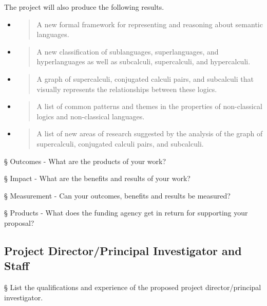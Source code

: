 The project will also produce the following results.

\begin{itemize}
\item
  \begin{quote}
  A new formal framework for representing and reasoning about semantic
  languages.
  \end{quote}
\item
  \begin{quote}
  A new classification of sublanguages, superlanguages, and
  hyperlanguages as well as subcalculi, supercalculi, and hypercalculi.
  \end{quote}
\item
  \begin{quote}
  A graph of supercalculi, conjugated calculi pairs, and subcalculi that
  visually represents the relationships between these logics.
  \end{quote}
\item
  \begin{quote}
  A list of common patterns and themes in the properties of
  non-classical logics and non-classical languages.
  \end{quote}
\item
  \begin{quote}
  A list of new areas of research suggested by the analysis of the graph
  of supercalculi, conjugated calculi pairs, and subcalculi.
  \end{quote}
\end{itemize}

§ Outcomes - What are the products of your work?

§ Impact - What are the benefits and results of your work?

§ Measurement - Can your outcomes, benefits and results be measured?

§ Products - What does the funding agency get in return for supporting
your proposal?

\hypertarget{project-directorprincipal-investigator-and-staff}{%
\subsection{\texorpdfstring{\textbf{Project Director/Principal
Investigator and
Staff}}{Project Director/Principal Investigator and Staff}}\label{project-directorprincipal-investigator-and-staff}}

§ List the qualifications and experience of the proposed project
director/principal investigator.

